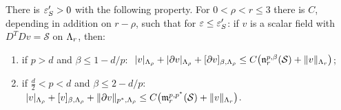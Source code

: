 \begin{proposition}\label{prop:scalar-lp}
There is $\varepsilon_S'>0$ with the following property. For $0<\rho<r\le3$ there is $C$, depending in addition on $r-\rho$, such that for $\varepsilon\le\varepsilon_S'$: if $v$ is a scalar field with $D^TDv=\mathcal S$ on $\Lambda_r$, then:
\begin{enumerate}[label=(\alph*)]
\item if $p>d$ and $\beta\le1-d/p$: $\ |v|_{\Lambda_\rho}+|\partial v|_{\Lambda_\rho}+[\partial v]_{\beta,\Lambda_\rho}\le C\big(\mathfrak n^{p,\beta}_r(\mathcal S)+\|v\|_{\Lambda_r}\big)$;
\item if $\frac d2<p<d$ and $\beta\le2-d/p$: $\ |v|_{\Lam_\rho}+[v]_{\beta,\Lam_\rho}+\|\partial v\|_{p^*,\Lam_\rho}\le C\big(\mathfrak m^{p,p^*}_r(\mathcal S)+\|v\|_{\Lam_r}\big)$.
\end{enumerate}
\end{proposition}

